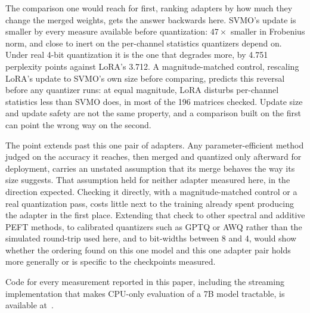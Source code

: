 \documentclass[conference]{IEEEtran}
\begin{document}
The comparison one would reach for first, ranking adapters by how much they change the merged weights, gets the answer backwards here. SVMO's update is smaller by every measure available before quantization: $47\times$ smaller in Frobenius norm, and close to inert on the per-channel statistics quantizers depend on. Under real 4-bit quantization it is the one that degrades more, by 4.751 perplexity points against LoRA's 3.712. A magnitude-matched control, rescaling LoRA's update to SVMO's own size before comparing, predicts this reversal before any quantizer runs: at equal magnitude, LoRA disturbs per-channel statistics less than SVMO does, in most of the 196 matrices checked. Update size and update safety are not the same property, and a comparison built on the first can point the wrong way on the second.

The point extends past this one pair of adapters. Any parameter-efficient method judged on the accuracy it reaches, then merged and quantized only afterward for deployment, carries an unstated assumption that its merge behaves the way its size suggests. That assumption held for neither adapter measured here, in the direction expected. Checking it directly, with a magnitude-matched control or a real quantization pass, costs little next to the training already spent producing the adapter in the first place. Extending that check to other spectral and additive PEFT methods, to calibrated quantizers such as GPTQ or AWQ rather than the simulated round-trip used here, and to bit-widths between 8 and 4, would show whether the ordering found on this one model and this one adapter pair holds more generally or is specific to the checkpoints measured.

Code for every measurement reported in this paper, including the streaming implementation that makes CPU-only evaluation of a 7B model tractable, is available at~\cite{prism-code}.



\end{document}

